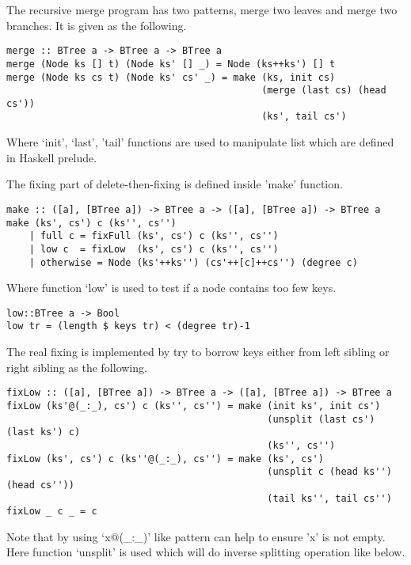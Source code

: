 \documentclass{article}
\begin{document}
The recursive merge program has two patterns, merge two leaves and
merge two branches. It is given as the following.

\begin{lstlisting}
merge :: BTree a -> BTree a -> BTree a
merge (Node ks [] t) (Node ks' [] _) = Node (ks++ks') [] t
merge (Node ks cs t) (Node ks' cs' _) = make (ks, init cs) 
                                             (merge (last cs) (head cs'))
                                             (ks', tail cs')
\end{lstlisting}

Where `init', `last', 'tail' functions are used to manipulate
list which are defined in Haskell prelude.

The fixing part of delete-then-fixing is defined inside 'make' 
function.

\begin{lstlisting}
make :: ([a], [BTree a]) -> BTree a -> ([a], [BTree a]) -> BTree a
make (ks', cs') c (ks'', cs'')
    | full c = fixFull (ks', cs') c (ks'', cs'')
    | low c  = fixLow  (ks', cs') c (ks'', cs'')
    | otherwise = Node (ks'++ks'') (cs'++[c]++cs'') (degree c)
\end{lstlisting}

Where function `low' is used to test if a node contains too few keys.

\begin{lstlisting}
low::BTree a -> Bool
low tr = (length $ keys tr) < (degree tr)-1
\end{lstlisting} %

The real fixing is implemented by try to borrow keys either from
left sibling or right sibling as the following.

\begin{lstlisting}
fixLow :: ([a], [BTree a]) -> BTree a -> ([a], [BTree a]) -> BTree a
fixLow (ks'@(_:_), cs') c (ks'', cs'') = make (init ks', init cs') 
                                              (unsplit (last cs') (last ks') c) 
                                              (ks'', cs'')
fixLow (ks', cs') c (ks''@(_:_), cs'') = make (ks', cs')
                                              (unsplit c (head ks'') (head cs''))
                                              (tail ks'', tail cs'')
fixLow _ c _ = c
\end{lstlisting}

Note that by using `x@(\_:\_)' like pattern can help to ensure 'x' is
not empty. Here function `unsplit' is used which will do inverse
splitting operation like below.
\end{document}
